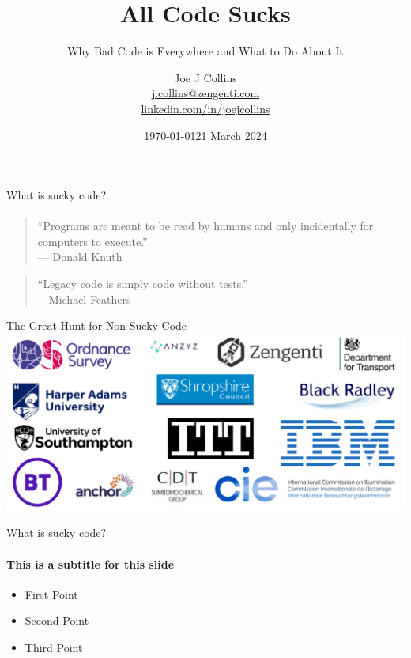 \documentclass[bigger]{beamer}
\begin{document}
\title{All Code Sucks}
\subtitle{Why Bad Code is Everywhere and What to Do About It}

\author{Joe J Collins \\
  \href{mailto:j.collins@zengenti.com}{j.collins@zengenti.com} \\ 
  \href{https://linkedin.com/in/joejcollins}{linkedin.com/in/joejcollins}
}
        

\date{\today}
\date{21 March 2024} 

\frame{\titlepage}

\begin{frame}{What is sucky code?}
  \framesubtitle{}
  \begin{quote}
    ``Programs are meant to be read by humans and
only incidentally for computers to execute.''\\
\hfill --- Donald Knuth
\end{quote}
\bigskip
\begin{quote}
``Legacy code is simply code without tests.''\\
\hfill ---Michael Feathers
  \end{quote}
\end{frame}

\begin{frame}{The Great Hunt for Non Sucky Code}
\includegraphics[width=\textwidth]{images/companies.png}
\end{frame}

\begin{frame}{What is sucky code?}
  \framesubtitle{This is a subtitle for this slide}
\begin{itemize}
  \item First Point
  \item Second Point
  \item Third Point
\end{itemize}
\end{frame}
\end{document}
